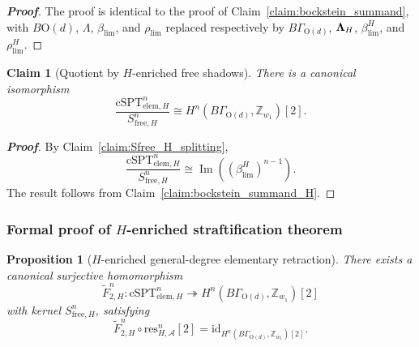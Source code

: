\documentclass[aps,prx,reprint,superscriptaddress,twocolumn,amsmath,amssymb,amsfonts, nofootinbib]{revtex4-2}
\newcommand{\res}{\text{res}}
\theoremstyle{apsstyle}
\newtheorem{proposition}[theorem]{Proposition}
\newtheorem{claim}{Claim}
\begin{document}
\begin{proof}[\textnormal{\textbf{Proof}}]
The proof is identical to the proof of Claim~\ref{claim:bockstein_summand}, with $B\mathrm{O}(d)$, $\Lambda$, $\beta_{\lim}$, and $\rho_{\lim}$ replaced respectively by $B\Gamma_{\mathrm{O}(d)}$, ${\bf \Lambda}_{H}$, $\beta_{\lim}^{H}$, and $\rho_{\lim}^{H}$.

\end{proof}

\begin{claim}[Quotient by $H$-enriched free shadows]
\label{claim:free_shadow_quotient_H}
There is a canonical isomorphism
\begin{equation}
\frac{\mathrm{cSPT}_{\mathrm{elem},H}^{n}}
{S_{\mathrm{free},H}^{n}}
\cong
H^n(B\Gamma_{\mathrm{O}(d)},\mathbb Z_{w_1})[2].
\end{equation}
\end{claim}

\begin{proof}[\textnormal{\textbf{Proof}}]
By Claim~\ref{claim:Sfree_H_splitting},
\begin{equation}
\frac{\mathrm{cSPT}_{\mathrm{elem},H}^{n}}
{S_{\mathrm{free},H}^{n}}
\cong
\operatorname{Im}\left(\left(\beta_{\lim}^{H}\right)^{n-1}\right).
\end{equation}
The result follows from Claim~\ref{claim:bockstein_summand_H}.
\end{proof}

\subsubsection{Formal proof of $H$-enriched straftification theorem}
\label{app:final_proof_H}

\begin{proposition}[$H$-enriched general-degree elementary retraction]
\label{prop:general_degree_retraction_H}
There exists a canonical surjective homomorphism
\begin{equation}
\widetilde F_{2,H}^{n}:
\mathrm{cSPT}_{\mathrm{elem},H}^{n}
\twoheadrightarrow
H^{n}(B\Gamma_{\mathrm{O}(d)},\mathbb Z_{w_1})[2]
\end{equation}
with kernel $S_{\mathrm{free},H}^{n}$, satisfying
\begin{equation}
\widetilde F_{2,H}^{n}\circ \res_{H,\mathcal A}^{n}[2]
=
\mathrm{id}_{H^{n}(B\Gamma_{\mathrm{O}(d)},\mathbb Z_{w_1})[2]}.
\end{equation}
\end{proposition}
\end{document}
